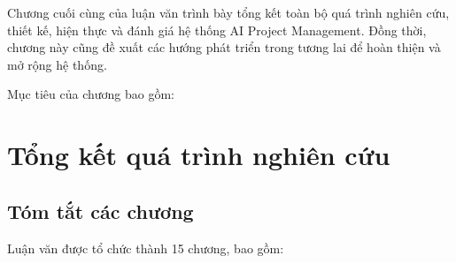 \documentclass[12pt,a4paper]{report}
\begin{document}
Chương cuối cùng của luận văn trình bày tổng kết toàn bộ quá trình nghiên cứu, thiết kế, hiện thực và đánh giá hệ thống AI Project Management. Đồng thời, chương này cũng đề xuất các hướng phát triển trong tương lai để hoàn thiện và mở rộng hệ thống.

Mục tiêu của chương bao gồm:
\section{Tổng kết quá trình nghiên cứu}

\subsection{Tóm tắt các chương}

Luận văn được tổ chức thành 15 chương, bao gồm:
\end{document}
